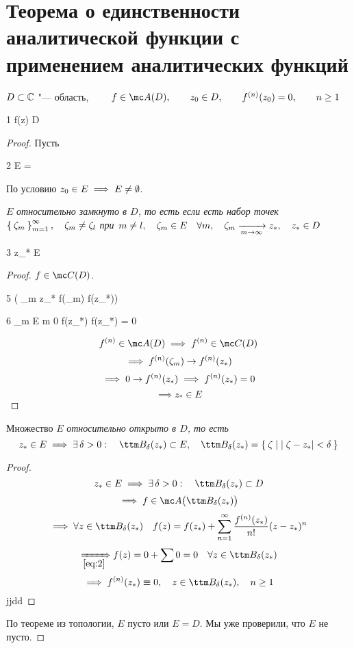 \section{Теорема о единственности аналитической функции с применением аналитических функций}

\begin{theorem}
	$ D \subset \mathbb{C} $ "--- область, $ \qquad f \in \mc A(D), \qquad z_0 \in D, \qquad \nder f(z_0) = 0, \qquad n \ge 1 $
	\begin{equ}1
		\implies f(z)   D
	\end{equ}
\end{theorem}

\begin{proof}
	Пусть
	\begin{equ}2
		E = \set{\zeta \in D \mid f(\zeta) = 0, \quad \nder f(\zeta) = 0 \quad \forall n \ge 1}
	\end{equ}
	По условию $ z_0 \in E \implies E \ne \emptyset $.
	\begin{statement}
		$ E $ \it{относительно замкнуто} в $ D $, то есть если есть набор точек $ \Set{\zeta_m}_{m=1}^{\infty}, \quad \zeta_m \ne \zeta_l $ при $ m \ne l, \quad \zeta_m \in E \quad \forall m, \quad \zeta_m \xrightarrow[m \to \infty]{} z_*, \quad z_* \in D $
		\begin{equ}3
			\implies z_* \in E
		\end{equ}
	\end{statement}
	\begin{proof}
		$ f \in \mc C(D) $.
		\begin{equ}5
			\implies \bigg( \zeta_m \to z_* \implies f(\zeta_m) \to f(z_*))
		\end{equ}
		\begin{equ}6
			\zeta_m \in E \quad \forall m \quad {} 0 \to f(z_*) \implies f(z_*) = 0
		\end{equ}
		$$ \nder f \in \mc A(D) \implies \nder f \in \mc C(D) $$
		$$ \implies {f}^{({n})}(\zeta_m) \to {f}^{({n})}(z_*) $$
		$$ \implies 0 \to {f}^{({n})}(z_*) \implies {f}^{({n})}(z_*) = 0 $$
		$$ \implies z_* \in E $$
	\end{proof}
	\begin{statement}
		Множество $ E $ \it{относительно открыто} в $ D $, то есть
		$$ z_* \in E \implies \exist \delta > 0 : \quad \ttm B_\delta (z_*) \sub E, \quad \ttm B_\delta (z_*) = \set{\zeta \mid |\zeta - z_*| < \delta} $$
	\end{statement}
	\begin{proof}
		$$ z_* \in E \implies \exist \delta > 0 : \quad \ttm B_\delta(z_*) \sub D $$
		$$ \implies f \in \mc A \big( \ttm B_\delta(z_*) \big) $$
		$$ \implies \forall z \in \ttm B_\delta (z_*) \quad f(z) = f(z_*) + \sum_{n = 1}^\infty \frac{\nder f(z_*)}{n!} (z - z_*)^n $$
		$$ \underimp{\eref2} f(z) = 0 + \sum 0 = 0 \quad \forall z \in \ttm B_\delta (z_*) $$
		$$ \implies \nder f(z_*) \equiv 0, \quad z \in \ttm B_\delta (z_*), \quad n \ge 1 $$jjdd
	\end{proof}
	По теореме из топологии, $ E $ пусто или $ E = D $. Мы уже проверили, что $ E $ не пусто.
\end{proof}

